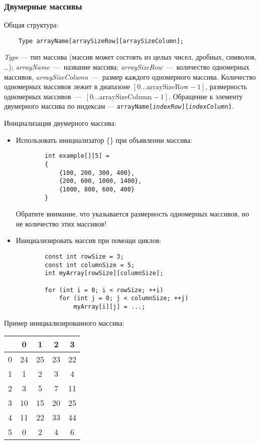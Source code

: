\subsubsection{Двумерные массивы}
Общая структура:
\begin{lstlisting}
    Type arrayName[arraySizeRow][arraySizeColumn];
\end{lstlisting}

\textit{Type} --- тип массива (массив может состоять из целых чисел, дробных, символов, \ldots); \textit{arrayName}~---~название массива; \textit{arraySizeRow}~---~количество одномерных массивов, \textit{arraySizeColumn}~---~размер каждого одномерного массива. Количество одномерных массивов лежит в диапазоне $\left[ 0 \ldots \text{arraySizeRow} - 1 \right]$, размерность одномерных массивов~---~$\left[ 0 \ldots \text{arraySizeColumn} - 1 \right]$. Обращение к элементу двумерного массива по индексам --- \texttt{arrayName[\textit{indexRow}][\textit{indexColumn}]}.

Инициализация двумерного массива:
\begin{itemize}
    \item Использовать инициализатор \{\} при объявлении массива:
    \begin{lstlisting}
        int example[][5] =
        {
            {100, 200, 300, 400},
            {200, 600, 1000, 1400},
            {1000, 800, 600, 400}
        }
    \end{lstlisting}

    Обратите внимание, что указывается размерность одномерных массивов, но не количество этих массивов!

    \item Инициализировать массив при помощи циклов:
    \begin{lstlisting}
        const int rowSize = 3;
        const int columnSize = 5;
        int myArray[rowSize][columnSize];

        for (int i = 0; i < rowSize; ++i)
            for (int j = 0; j < columnSize; ++j)
                myArray[i][j] = ...;
    \end{lstlisting}
\end{itemize}

Пример инициализированного массива:
\begin{table}[h]
    \begin{tabular}{|c|c|c|c|c|}
        \hline
          & 0 & 1 & 2 & 3 \\
        \hline
        0 & 24 & 25 & 23 & 22 \\
        \hline
        1 & 1 & 2 & 3 & 4 \\
        \hline
        2 & 3 & 5 & 7 & 11 \\
        \hline
        3 & 10 & 15 & 20 & 25 \\
        \hline
        4 & 11 & 22 & 33 & 44 \\
        \hline
        5 & 0 & 2 & 4 & 6 \\
        \hline
    \end{tabular}
\end{table}